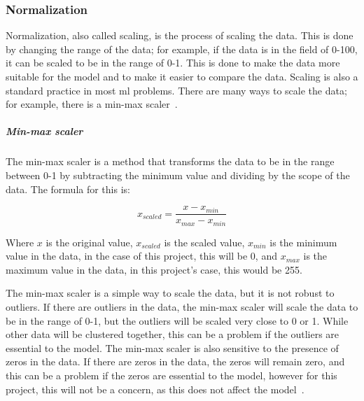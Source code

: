 \subsubsection{Normalization}\label{sec:normalization}
Normalization, also called scaling, is the process of scaling the data. This is done by changing the range of the data; for example, if the data is in the field of 0-100, it can be scaled to be in the range of 0-1. This is done to make the data more suitable for the model and to make it easier to compare the data. Scaling is also a standard practice in most \gls{ml} problems. There are many ways to scale the data; for example, there is a min-max scaler~\cite{Feature-engineering-zheng}.

  
\subparagraph{Min-max scaler}\label{subsec:min-max}
The min-max scaler is a method that transforms the data to be in the range between 0-1 by subtracting the minimum value and dividing by the scope of the data. The formula for this is:

\begin{equation}
    x_{scaled} = \frac{x - x_{min}}{x_{max} - x_{min}}
\end{equation}

Where $x$ is the original value, $x_{scaled}$ is the scaled value, $x_{min}$ is the minimum value in the data, in the case of this project, this will be 0, and $x_{max}$ is the maximum value in the data, in this project's case, this would be 255.

The min-max scaler is a simple way to scale the data, but it is not robust to outliers. If there are outliers in the data, the min-max scaler will scale the data to be in the range of 0-1, but the outliers will be scaled very close to 0 or 1. While other data will be clustered together, this can be a problem if the outliers are essential to the model. The min-max scaler is also sensitive to the presence of zeros in the data. If there are zeros in the data, the zeros will remain zero, and this can be a problem if the zeros are essential to the model, however for this project, this will not be a concern, as this does not affect the model~\cite{Feature-engineering-zheng}.



